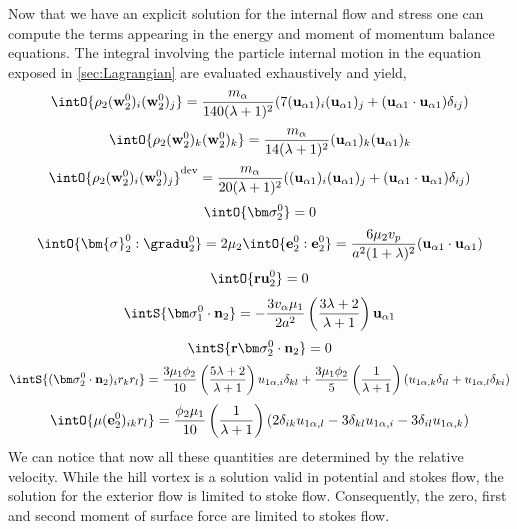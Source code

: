 Now that we have an explicit solution for the internal flow and stress one can compute the terms appearing in the energy and moment of momentum balance equations. 
The integral involving the particle internal motion in the equation exposed in \ref{sec:Lagrangian} are evaluated exhaustively and yield, 
\begin{equation*}
    \intO{\rho_2(\textbf{w}_2^0)_i (\textbf{w}_2^0)_j}
    = \frac{m_\alpha}{140 (\lambda +1)^2}
    (7 (\textbf{u}_{\alpha 1})_i(\textbf{u}_{\alpha 1})_j + (\textbf{u}_{\alpha 1}\cdot \textbf{u}_{\alpha 1})\delta_{ij})
\end{equation*} 
\begin{equation*}
    \intO{\rho_2(\textbf{w}_2^0)_k (\textbf{w}_2^0)_k}
    = \frac{m_\alpha}{14 (\lambda +1)^2}
     (\textbf{u}_{\alpha 1})_k(\textbf{u}_{\alpha 1})_k
\end{equation*} 
\begin{equation*}
    \intO{\rho_2(\textbf{w}_2^0)_i (\textbf{w}_2^0)_j}^\text{dev}
    = \frac{m_\alpha}{20 (\lambda +1)^2}
    ((\textbf{u}_{\alpha 1})_i(\textbf{u}_{\alpha 1})_j + (\textbf{u}_{\alpha 1}\cdot \textbf{u}_{\alpha 1})\delta_{ij})
\end{equation*} 
\begin{equation*}
    \intO{\bm\sigma_2^0}
    = 0 
\end{equation*}
\begin{equation*}
    \intO{\bm{\sigma}_2^0:\grad \textbf{u}_2^0}
    = 2\mu_2 \intO{\textbf{e}_2^0: \textbf{e}_2^0 }
    = 
    \frac{6 \mu_2 v_p}{a^2(1+\lambda)^2}
    (\textbf{u}_{\alpha 1}\cdot \textbf{u}_{\alpha 1})
\end{equation*}
\begin{align*}
    \intO{\textbf{r}\textbf{u}_2^0}
    = 0 
\end{align*}
\begin{equation*}
    \intS{\bm\sigma_1^0\cdot \textbf{n}_2}
    = - \frac{3v_\alpha\mu_1}{2 a^2} 
    \left(\frac{3\lambda+2}{\lambda+1}\right) 
    \textbf{u}_{\alpha 1}
\end{equation*}
\begin{equation*}
    \intS{\textbf{r}\bm\sigma_2^0\cdot \textbf{n}_2}
    = 0 
\end{equation*}
\begin{equation*}
    \intS{(\bm\sigma_2^0\cdot \textbf{n}_2)_i r_kr_l}
    = \frac{3\mu_1\phi_2}{10}\left(\frac{5\lambda+2}{\lambda+1}\right)u_{1 \alpha,i}\delta_{kl}
    + \frac{3\mu_1\phi_2}{5}\left(\frac{1}{\lambda+1}\right)(u_{1 \alpha,k}\delta_{il}+u_{1 \alpha,l}\delta_{ki})
\end{equation*}
\begin{equation*}
    \intO{\mu(\textbf{e}_2^0)_{ik} r_l} =
    \frac{\phi_2\mu_1}{10}\left(\frac{1}{\lambda+1}\right)
    \left(
        2\delta_{ik}u_{1 \alpha , l}
        -3\delta_{kl}u_{1 \alpha , i}
        -3\delta_{il}u_{1 \alpha , k}
    \right)
\end{equation*}
We can notice that now all these quantities are determined by the relative velocity.  
While the hill vortex is a solution valid in potential and stokes flow, the solution for the exterior flow is limited to stoke flow. 
Consequently, the zero, first and second moment of surface force are limited to stokes flow. 

